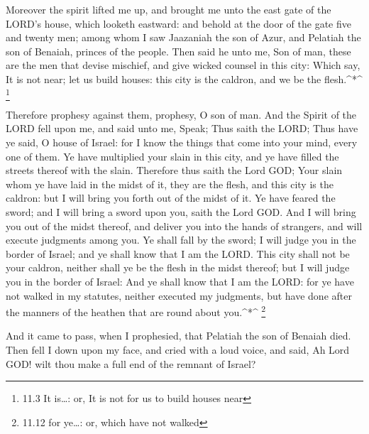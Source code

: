  Moreover the spirit lifted me up, and brought me unto the
east gate of the LORD's house, which looketh eastward: and behold at the
door of the gate five and twenty men; among whom I saw Jaazaniah the son
of Azur, and Pelatiah the son of Benaiah, princes of the people.
 Then said he unto me, Son of man, these are the men that
devise mischief, and give wicked counsel in this city: 
Which say, It is not near; let us build houses: this city is the
caldron, and we be the flesh.\^{}*\^{} \footnote{11.3 It is\ldots: or,
  It is not for us to build houses near}

 Therefore prophesy against them, prophesy, O son of man.
 And the Spirit of the LORD fell upon me, and said unto me,
Speak; Thus saith the LORD; Thus have ye said, O house of Israel: for I
know the things that come into your mind, every one of them.
 Ye have multiplied your slain in this city, and ye have
filled the streets thereof with the slain.  Therefore thus
saith the Lord GOD; Your slain whom ye have laid in the midst of it,
they are the flesh, and this city is the caldron: but I will bring you
forth out of the midst of it.  Ye have feared the sword; and
I will bring a sword upon you, saith the Lord GOD.  And I
will bring you out of the midst thereof, and deliver you into the hands
of strangers, and will execute judgments among you.  Ye
shall fall by the sword; I will judge you in the border of Israel; and
ye shall know that I am the LORD.  This city shall not be
your caldron, neither shall ye be the flesh in the midst thereof; but I
will judge you in the border of Israel:  And ye shall know
that I am the LORD: for ye have not walked in my statutes, neither
executed my judgments, but have done after the manners of the heathen
that are round about you.\^{}*\^{} \footnote{11.12 for ye\ldots: or,
  which have not walked}

 And it came to pass, when I prophesied, that Pelatiah the
son of Benaiah died. Then fell I down upon my face, and cried with a
loud voice, and said, Ah Lord GOD! wilt thou make a full end of the
remnant of Israel?

